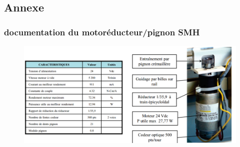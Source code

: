 \subsection{Annexe}
\subsubsection{documentation du motoréducteur/pignon SMH}
\begin{figure}[!htb]
\begin{center}
\includegraphics[width=1.0\textwidth]{images/moteur.png}
\end{center}
\end{figure}
\FloatBarrier
